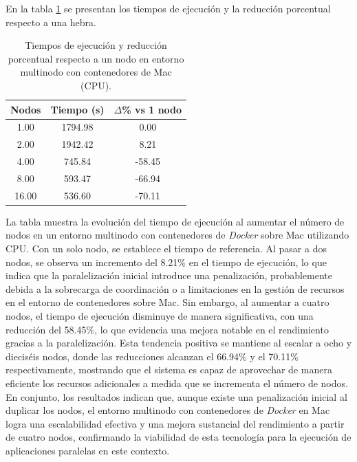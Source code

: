 En la tabla \ref{tab:multi-node_mac_\textit{Docker}} se presentan los tiempos de ejecución y la reducción porcentual respecto a una hebra.

\begin{table}[ht]
    \centering
    \begin{tabular}{|c|c|c|}
        \hline
        \textbf{Nodos} & \textbf{Tiempo (s)} & \textbf{$\Delta$\% vs 1 nodo} \\
        \hline
        1.00           & 1794.98             & 0.00                          \\
        2.00           & 1942.42             & 8.21                          \\
        4.00           & 745.84              & -58.45                        \\
        8.00           & 593.47              & -66.94                        \\
        16.00          & 536.60              & -70.11                        \\
        \hline
    \end{tabular}
    \caption{Tiempos de ejecución y reducción porcentual respecto a un nodo en entorno multinodo con contenedores de Mac (CPU).}
    \label{tab:multi-node_mac_\textit{Docker}}
\end{table}

La tabla muestra la evolución del tiempo de ejecución al aumentar el número de nodos en un entorno multinodo con contenedores de \textit{Docker} sobre Mac utilizando CPU. Con un solo nodo, se establece el tiempo de referencia. Al pasar a dos nodos, se observa un incremento del 8.21\% en el tiempo de ejecución, lo que indica que la paralelización inicial introduce una penalización, probablemente debida a la sobrecarga de coordinación o a limitaciones en la gestión de recursos en el entorno de contenedores sobre Mac. Sin embargo, al aumentar a cuatro nodos, el tiempo de ejecución disminuye de manera significativa, con una reducción del 58.45\%, lo que evidencia una mejora notable en el rendimiento gracias a la paralelización. Esta tendencia positiva se mantiene al escalar a ocho y dieciséis nodos, donde las reducciones alcanzan el 66.94\% y el 70.11\% respectivamente, mostrando que el sistema es capaz de aprovechar de manera eficiente los recursos adicionales a medida que se incrementa el número de nodos. En conjunto, los resultados indican que, aunque existe una penalización inicial al duplicar los nodos, el entorno multinodo con contenedores de \textit{Docker} en Mac logra una escalabilidad efectiva y una mejora sustancial del rendimiento a partir de cuatro nodos, confirmando la viabilidad de esta tecnología para la ejecución de aplicaciones paralelas en este contexto.

